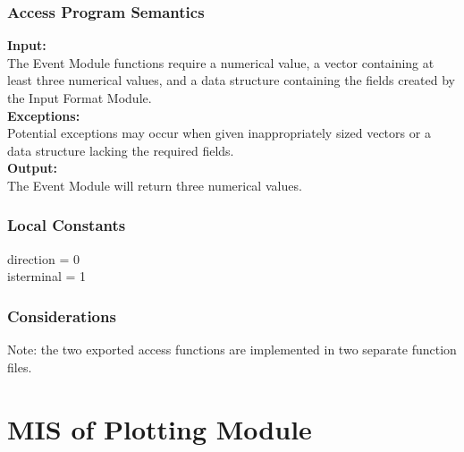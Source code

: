 \documentclass[12pt]{article}
\begin{document}



\subsubsection{Access Program Semantics}
\noindent \textbf{Input:}\\
The Event Module functions require a numerical value, a vector containing at 
least three numerical values, and a data structure containing the fields created by the 
Input Format Module. \\

\noindent \textbf{Exceptions:}\\
Potential exceptions may occur when given inappropriately sized
vectors or a data structure lacking the required fields.\\

\noindent \textbf{Output:}\\
The Event Module will return three numerical values.  \\

\subsubsection{Local Constants}
direction = 0\\
isterminal = 1\\

\subsubsection{Considerations}
Note: the two exported access functions are implemented in two separate function files.


\section{MIS of Plotting Module}
\end{document}
